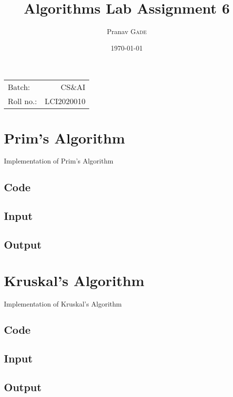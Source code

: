 \documentclass{article}
\title{Algorithms Lab Assignment 6} %
\author{Pranav \textsc{Gade}} %
\date{\today} %
\begin{document}
    \maketitle %

    \begin{center}
        \begin{tabular}{l r}
            Batch:    & CS\&AI     \\
            Roll no.: & LCI2020010
        \end{tabular}
    \end{center}


    \section{Prim's Algorithm}
    Implementation of Prim's Algorithm
    \subsection{Code}
    

    \subsection{Input}
    

    \subsection{Output}
    

    \section{Kruskal's Algorithm}
    Implementation of Kruskal's Algorithm
    \subsection{Code}
    

    \subsection{Input}
    

    \subsection{Output}
    
\end{document}
